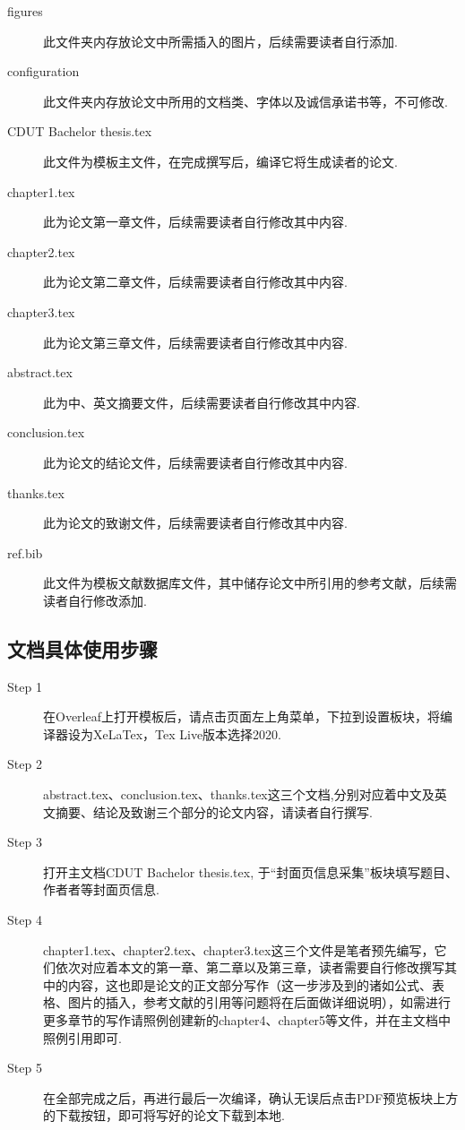 \begin{description}
  \item[figures]  此文件夹内存放论文中所需插入的图片，后续需要读者自行添加.
  
  \item[configuration]  此文件夹内存放论文中所用的文档类、字体以及诚信承诺书等，不可修改.
  
  \item[CDUT Bachelor thesis.tex]  此文件为模板主文件，在完成撰写后，编译它将生成读者的论文.
  
  \item[chapter1.tex]  此为论文第一章文件，后续需要读者自行修改其中内容.
  
  \item[chapter2.tex]  此为论文第二章文件，后续需要读者自行修改其中内容.
  
  \item[chapter3.tex]  此为论文第三章文件，后续需要读者自行修改其中内容.
  
  \item[abstract.tex]  此为中、英文摘要文件，后续需要读者自行修改其中内容.
  
  \item[conclusion.tex]  此为论文的结论文件，后续需要读者自行修改其中内容.
  
  \item[thanks.tex]  此为论文的致谢文件，后续需要读者自行修改其中内容.
  
  \item[ref.bib]  此文件为模板文献数据库文件，其中储存论文中所引用的参考文献，后续需读者自行修改添加.
\end{description}

\subsection{文档具体使用步骤}

\begin{description}
  \item[Step 1]  在Overleaf上打开模板后，请点击页面左上角菜单，下拉到设置板块，将编译器设为XeLaTex，Tex Live版本选择2020.
  
  \item[Step 2]  abstract.tex、conclusion.tex、thanks.tex这三个文档,分别对应着中文及英文摘要、结论及致谢三个部分的论文内容，请读者自行撰写.

  \item[Step 3]  打开主文档CDUT Bachelor thesis.tex, 于“封面页信息采集”板块填写题目、作者者等封面页信息.

  \item[Step 4]  chapter1.tex、chapter2.tex、chapter3.tex这三个文件是笔者预先编写，它们依次对应着本文的第一章、第二章以及第三章，读者需要自行修改撰写其中的内容，这也即是论文的正文部分写作（这一步涉及到的诸如公式、表格、图片的插入，参考文献的引用等问题将在后面做详细说明），如需进行更多章节的写作请照例创建新的chapter4、chapter5等文件，并在主文档中照例引用即可.
  
  \item[Step 5]  在全部完成之后，再进行最后一次编译，确认无误后点击PDF预览板块上方的下载按钮，即可将写好的论文下载到本地.
\end{description}

